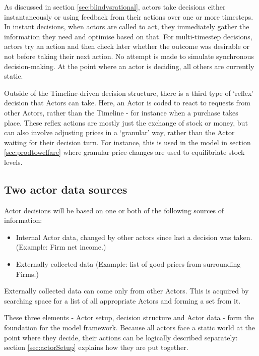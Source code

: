 As discussed in section \ref{sec:blindvsrational}, actors take decisions either instantaneously or using feedback from their actions over one or more timesteps. In instant decisions, when actors are called to act, they immediately gather the information they need and optimise based on that. For multi-timestep decisions, actors try an action and then check later whether the outcome was desirable or not before taking their next action. No attempt is made to simulate synchronous decision-making. At the point where an actor is deciding, all others are currently static.

Outside of the Timeline-driven decision structure, there is a third type of `reflex' decision that Actors can take. Here, an Actor is coded to react to requests from other Actors, rather than the Timeline - for instance when a purchase takes place. These reflex actions are mostly just the exchange of stock or money, but can also involve adjusting prices in a `granular' way, rather than the Actor waiting for their decision turn. For instance, this is used in the model in section \ref{sec:prodtowelfare} where granular price-changes are used to equilibriate stock levels.

\subsection{Two actor data sources}

Actor decisions will be based on one or both of the following sources of information:

\begin{itemize}
	\item Internal Actor data, changed by other actors since last a decision was taken. (Example: Firm net income.)
	\item Externally collected data (Example: list of good prices from surrounding Firms.)
\end{itemize}

Externally collected data can come only from other Actors. This is acquired by searching space for a list of all appropriate Actors and forming a set from it.

These three elements - Actor setup, decision structure and Actor data - form the foundation for the model framework. Because all actors face a static world at the point where they decide, their actions can be logically described separately: section \ref{sec:actorSetup} explains how they are put together. 

